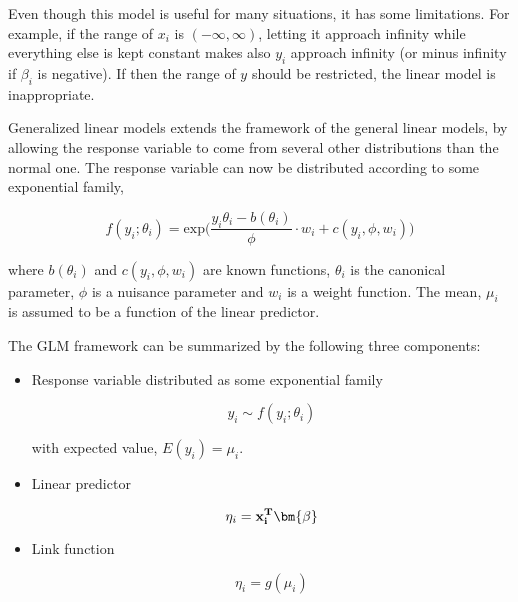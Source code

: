 Even though this model is useful for many situations, it has some limitations. For example, if the range of $x_{i}$ is $(-\infty, \infty)$, letting it approach infinity while everything else is kept constant makes also $y_i$ approach infinity (or minus infinity if $\beta_i$ is negative). If then the range of $y$ should be restricted, the linear model is inappropriate. 



Generalized linear models extends the framework of the general linear models, by allowing the response variable to come from several other distributions than the normal one. The response variable can now be distributed according to some exponential family, 

\begin{equation}
    f(y_i;\theta_i) = \text{exp}\Big(\frac{y_i \theta_i - b(\theta_i)}{\phi} \cdot w_i + c(y_i,\phi,w_i)\Big)
\end{equation}

where $b(\theta_i)$ and $c(y_i,\phi,w_i)$ are known functions, $\theta_i$ is the canonical parameter, $\phi$ is a nuisance parameter and $w_i$ is a weight function. The mean, $\mu_i$ is assumed to be a function of the linear predictor.

The GLM framework can be summarized by the following three components:

\begin{itemize}

\item Response variable distributed as some exponential family

\begin{equation}
    y_{i} \sim f(y_i;\theta_i)
\end{equation}

with expected value, $E(y_i) = \mu_i$.

\item Linear predictor

\begin{equation}
    \eta_i = \bf x_i^T \bm{ \beta}
\end{equation}

\item Link function

\begin{equation}
    \eta_i = g(\mu_i)
\end{equation}

\end{itemize}



